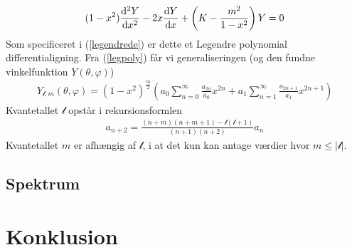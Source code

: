 \documentclass[12pt]{article}
\theoremstyle{definition}
\theoremstyle{remark}
\theoremstyle{definition}
\numberwithin{equation}{section}
\begin{document}
\begin{align}
    (1-x^2)\frac{{\rm d}^2Y}{{\rm d}x^2}-2x\frac{{\rm d}Y}{{\rm d}x}+\left(K-\frac{m^2}{1-x^2}\right)Y=0
\end{align}
Som specificeret i (\ref{legendrede}) er dette et Legendre polynomial differentialigning. Fra (\ref{legpoly}) får vi generaliseringen (og den fundne vinkelfunktion $Y(\theta, \varphi)$)
\begin{align}
    Y_{\mathscr l,m}(\theta, \varphi)=(1-x^2)^{\frac{m}{2}}\left(a_0\sum_{n=0}^{\infty}\frac{a_{2n}}{a_0}x^{2n}+a_1\sum_{n=1}^{\infty}\frac{a_{2n+1}}{a_1}x^{2n+1}\right)
\end{align}
Kvantetallet $\mathscr l$ opstår i rekursionsformlen
\begin{align}
    a_{n+2}=\frac{(n+m)(n+m+1)-\mathscr l(\mathscr l+1)}{(n+1)(n+2)}a_n
\end{align}
Kvantetallet $m$ er afhængig af $\mathscr l$, i at det kun kan antage værdier hvor $m\leq|\mathscr l|$.

\subsection{Spektrum}

\section{Konklusion}

\newpage
\nocite{*}
\printbibliography
\end{document}
